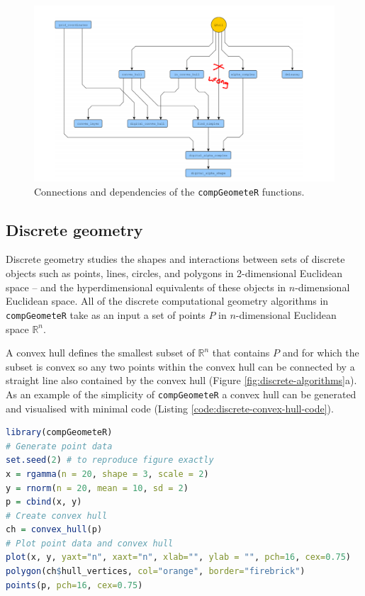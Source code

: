 \documentclass[12pt, a4paper]{article}
\begin{document}
\begin{figure}[ht]
\centering
\includegraphics[width=15cm]{figures/software-structure/software-structure_arrow_to_be_remove.png}
\caption{Connections and dependencies of the \texttt{compGeometeR} functions.}
\label{fig:software-structure}
\end{figure}

\subsection{Discrete geometry}

Discrete geometry studies the shapes and interactions between sets of discrete objects such as points, lines, circles, and polygons in 2-dimensional Euclidean space -- and the hyperdimensional equivalents of these objects in $n$-dimensional Euclidean space.  All of the discrete computational geometry algorithms in \texttt{compGeometeR} take as an input a set of points $P$ in $n$-dimensional Euclidean space $\mathbb{R}^n$.

A convex hull \citep{barber-1996} defines the smallest subset of $\mathbb{R}^n$ that contains $P$ and for which the subset is convex so any two points within the convex hull can be connected by a straight line also contained by the convex hull (Figure \ref{fig:discrete-algorithms}a).  As an example of the simplicity of \texttt{compGeometeR} a convex hull can be generated and visualised with minimal code (Listing \ref{code:discrete-convex-hull-code}).

\begin{lstlisting}[language=R, caption=Example \texttt{R} code to create a discrete convex hull with \texttt{compGeometeR}, label={code:discrete-convex-hull-code}]
library(compGeometeR)
# Generate point data
set.seed(2) # to reproduce figure exactly
x = rgamma(n = 20, shape = 3, scale = 2)
y = rnorm(n = 20, mean = 10, sd = 2)
p = cbind(x, y)
# Create convex hull
ch = convex_hull(p)
# Plot point data and convex hull
plot(x, y, yaxt="n", xaxt="n", xlab="", ylab = "", pch=16, cex=0.75)
polygon(ch$hull_vertices, col="orange", border="firebrick")
points(p, pch=16, cex=0.75)
\end{lstlisting}
\end{document}
